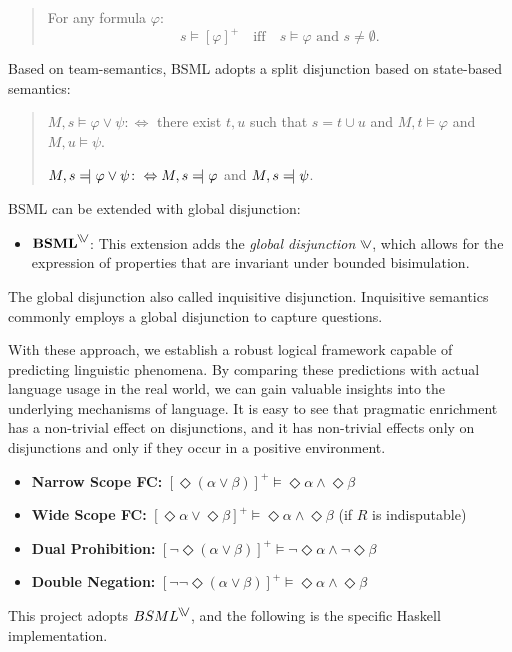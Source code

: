 \begin{quote}
For any formula \( \varphi \): 
\[
s \models {[ \varphi ]}^+ \quad \text{iff} \quad s \models \varphi \text{ and } s \neq \emptyset.
\]
\end{quote}

 Based on team-semantics, BSML adopts a split disjunction based on state-based semantics:

\begin{quote}
    $M, s \models \varphi \vee \psi \colon \Leftrightarrow$ there exist $t, u$ such that $s = t \cup u$ and $M, t \models \varphi$ and $M, u \models \psi$.
    
    $M, s \leftmodels \varphi \vee \psi \colon \Leftrightarrow M, s \leftmodels \varphi$ and $M, s \leftmodels \psi$.
\end{quote}


BSML can be extended with global disjunction:
\begin{itemize}
    \item \(\textbf{BSML}^{\inqdisj}\): This extension adds the \textit{global disjunction} \(\inqdisj\), which allows for the expression of properties that are invariant under bounded bisimulation.
\end{itemize}

The global disjunction also called inquisitive disjunction. 
Inquisitive semantics commonly employs a global disjunction to capture questions. 


With these approach, we establish a robust logical framework capable of predicting linguistic phenomena. 
By comparing these predictions with actual language usage in the real world, we can gain valuable insights into the underlying mechanisms of language.
It is easy to see that pragmatic enrichment has a non-trivial effect on disjunctions, 
and it has non-trivial effects only on disjunctions and only if they occur in a positive environment.  

\begin{itemize}
    \item \textbf{Narrow Scope FC:} \quad ${[ \Diamond (\alpha \lor \beta) ]}^+ \models \Diamond \alpha \land \Diamond \beta$
    \item \textbf{Wide Scope FC:} \quad ${[\Diamond \alpha \lor \Diamond \beta]}^+ \models \Diamond \alpha \land \Diamond \beta$ 
          \quad (if $R$ is indisputable)
    \item \textbf{Dual Prohibition:} \quad ${[\neg \Diamond (\alpha \lor \beta)]}^+ \models \neg \Diamond \alpha \land \neg \Diamond \beta$
    \item \textbf{Double Negation:} \quad ${[\neg \neg \Diamond (\alpha \lor \beta)]}^+ \models \Diamond \alpha \land \Diamond \beta$
 \end{itemize}
 
 This project adopts $BSML^{\inqdisj}$, and the following is the specific Haskell implementation.
   